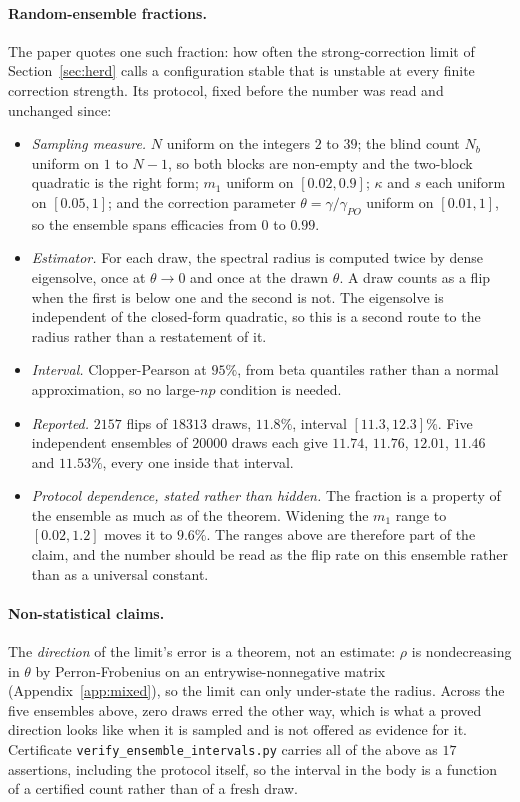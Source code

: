 \paragraph{Random-ensemble fractions.} The paper quotes one such fraction: how often the strong-correction limit of Section~\ref{sec:herd} calls a configuration stable that is unstable at every finite correction strength. Its protocol, fixed before the number was read and unchanged since:

\begin{itemize}\itemsep2pt
\item \emph{Sampling measure.} $N$ uniform on the integers $2$ to $39$; the blind count $N_b$ uniform on $1$ to $N-1$, so both blocks are non-empty and the two-block quadratic is the right form; $m_1$ uniform on $[0.02, 0.9]$; $\kappa$ and $s$ each uniform on $[0.05, 1]$; and the correction parameter $\theta = \gamma/\gamma_{PO}$ uniform on $[0.01, 1]$, so the ensemble spans efficacies from $0$ to $0.99$.
\item \emph{Estimator.} For each draw, the spectral radius is computed twice by dense eigensolve, once at $\theta \to 0$ and once at the drawn $\theta$. A draw counts as a flip when the first is below one and the second is not. The eigensolve is independent of the closed-form quadratic, so this is a second route to the radius rather than a restatement of it.
\item \emph{Interval.} Clopper-Pearson at $95\%$, from beta quantiles rather than a normal approximation, so no large-$np$ condition is needed.
\item \emph{Reported.} $2157$ flips of $18313$ draws, $11.8\%$, interval $[11.3, 12.3]\%$. Five independent ensembles of $20000$ draws each give $11.74$, $11.76$, $12.01$, $11.46$ and $11.53\%$, every one inside that interval.
\item \emph{Protocol dependence, stated rather than hidden.} The fraction is a property of the ensemble as much as of the theorem. Widening the $m_1$ range to $[0.02, 1.2]$ moves it to $9.6\%$. The ranges above are therefore part of the claim, and the number should be read as the flip rate on this ensemble rather than as a universal constant.
\end{itemize}

\paragraph{Non-statistical claims.} The \emph{direction} of the limit's error is a theorem, not an estimate: $\rho$ is nondecreasing in $\theta$ by Perron-Frobenius on an entrywise-nonnegative matrix (Appendix~\ref{app:mixed}), so the limit can only under-state the radius. Across the five ensembles above, zero draws erred the other way, which is what a proved direction looks like when it is sampled and is not offered as evidence for it. Certificate \texttt{verify\_ensemble\_intervals.py} carries all of the above as $17$ assertions, including the protocol itself, so the interval in the body is a function of a certified count rather than of a fresh draw.
